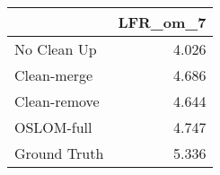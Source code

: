 \begin{tabular}{lr}
\toprule
{} & LFR_om_7 \\
\midrule
No Clean Up  &    4.026 \\
Clean-merge  &    4.686 \\
Clean-remove &    4.644 \\
OSLOM-full   &    4.747 \\
Ground Truth &    5.336 \\
\bottomrule
\end{tabular}

